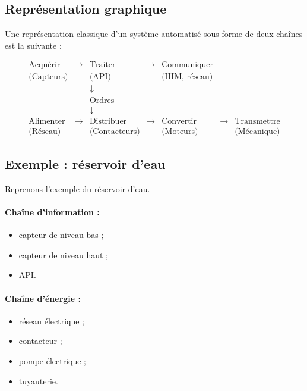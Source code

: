 \subsection{Représentation graphique}

Une représentation classique d'un système automatisé sous forme de deux chaînes est la suivante :

\[
\begin{array}{ccccccc}
\text{Acquérir} & \rightarrow & \text{Traiter} & \rightarrow & \text{Communiquer} & & \\
\text{(Capteurs)} & & \text{(API)} & & \text{(IHM, réseau)} & & \\
& & \downarrow & & & & \\
& & \text{Ordres} & & & & \\
& & \downarrow & & & & \\
\text{Alimenter} & \rightarrow & \text{Distribuer} & \rightarrow & \text{Convertir} & \rightarrow & \text{Transmettre} \\
\text{(Réseau)} & & \text{(Contacteurs)} & & \text{(Moteurs)} & & \text{(Mécanique)}
\end{array}
\]

\subsection{Exemple : réservoir d'eau}

Reprenons l'exemple du réservoir d'eau.

\paragraph{Chaîne d'information :}
\begin{itemize}
    \item capteur de niveau bas ;
    \item capteur de niveau haut ;
    \item API.
\end{itemize}

\paragraph{Chaîne d'énergie :}
\begin{itemize}
    \item réseau électrique ;
    \item contacteur ;
    \item pompe électrique ;
    \item tuyauterie.
\end{itemize}


